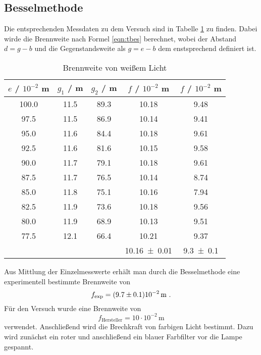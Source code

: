 \subsection{Besselmethode}
Die entsprechenden Messdaten zu dem Versuch sind in Tabelle \ref{tab:ffw} zu finden.  Dabei wirde die Brennweite nach Formel \ref{eqn:tbes} berechnet, wobei der Abstand $d = g - b$ und die Gegenstandsweite als $g = e - b$ dem enstsprechend definiert ist.
\begin{table}
  \centering
  \begin{tabular}{c c c | c c}
    \toprule
    $e$ / $10^{-2}$ m & $g_1$ / m & $g_2$ / m & $f$ / $10^{-2}$ m & $f$ / $10^{-2}$ m\\
    \midrule
	100.0	& 11.5	& 89.3	& 10.18	& 9.48	\\
	97.5	& 11.5	& 86.9	& 10.14	& 9.41	\\
	95.0	& 11.6	& 84.4	& 10.18	& 9.61	\\
	92.5	& 11.6	& 81.6	& 10.15	& 9.58	\\
	90.0	& 11.7	& 79.1	& 10.18	& 9.61	\\
	87.5	& 11.7	& 76.5	& 10.14	& 8.74	\\	
	85.0	& 11.8	& 75.1	& 10.16	& 7.94	\\	
	82.5	& 11.9	& 73.6	& 10.18	& 9.56	\\
	80.0	& 11.9	& 68.9	& 10.13	& 9.51	\\
	77.5	& 12.1	& 66.4	& 10.21	& 9.37	\\
   \midrule
		&	&	& \num{10.16 +- 0.01} & \num{9.3 +- 0.1} \\
   \bottomrule
  \end{tabular}
  	\caption{Brennweite von weißem Licht}
  \label{tab:ffw}
\end{table}
Aus Mittlung der Einzelmesswerte erhält man durch die Besselmethode eine experimentell bestimmte Brennweite von 
\begin{equation}
  f_\text{exp} = (\num{9.7 +- 0.1}) 10^{-2} \, \text{m} \ .
  \label{eqn:fexp}
\end{equation}
Für den Versuch wurde eine Brennweite von 
\begin{equation}
  f_\text{Hersteller} = 10 \cdot 10^{-2} \, \text{m}
  \label{eqn:fHer}
\end{equation}
verwendet.
Anschließend wird die Brechkraft von farbigen Licht bestimmt. Dazu wird zunächst ein roter und anschließend ein blauer Farbfilter vor die Lampe gespannt.
